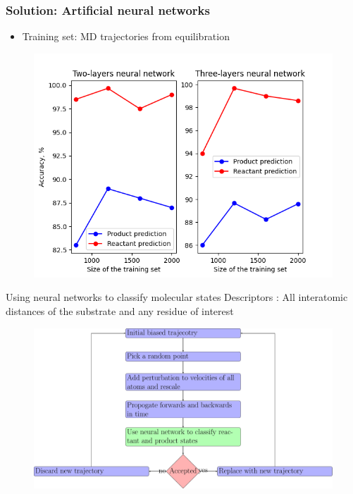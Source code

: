 \documentclass{beamer}
\begin{document}
\begin{frame}
\frametitle{Solution: Artificial neural networks}
\begin{block}{}
\begin{itemize}
\item Training set: MD trajectories from equilibration 
\end{itemize}
\end{block}
\pause
\begin{figure}
\includegraphics[scale=0.35]{figures/mbh_2waters_nn_comparison.png}
\end{figure}
Using neural networks to classify molecular states
Descriptors : All interatomic distances of the substrate and any residue of interest
\end{frame}
\begin{frame}
\begin{figure}
\includegraphics[scale=0.3]{flow/flowchart.pdf}
\end{figure}
\end{frame}
\end{document}

